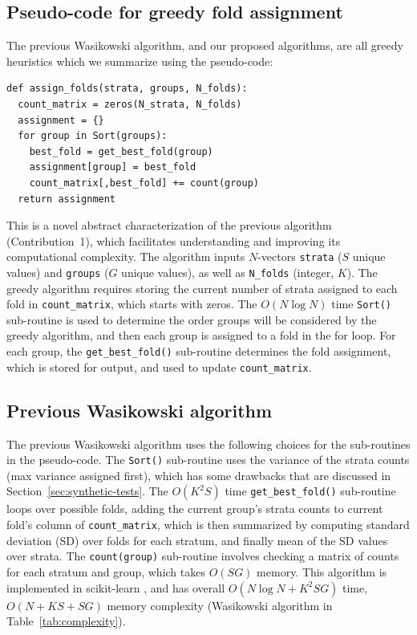 \documentclass[twoside]{article}
\begin{document}
\subsection{Pseudo-code for greedy fold assignment}
\label{sec:pseudo-code}
The previous Wasikowski algorithm, and our proposed algorithms, are all greedy heuristics which we summarize using the pseudo-code:
\begin{verbatim}
def assign_folds(strata, groups, N_folds):
  count_matrix = zeros(N_strata, N_folds)
  assignment = {}
  for group in Sort(groups):
    best_fold = get_best_fold(group)
    assignment[group] = best_fold
    count_matrix[,best_fold] += count(group)
  return assignment
\end{verbatim}
This is a novel abstract characterization of the previous algorithm (Contribution~1), which facilitates understanding and improving its computational complexity.
The algorithm inputs $N$-vectors \texttt{strata} ($S$ unique values) and \texttt{groups} ($G$ unique values), as well as \texttt{N\_folds} (integer, $K$).
The greedy algorithm requires storing the current number of strata assigned to each fold in \texttt{count\_matrix}, which starts with zeros.
The $O(N\log N)$ time \texttt{Sort()} sub-routine is used to determine the order groups will be considered by the greedy algorithm, and then each group is assigned to a fold in the for loop.
For each group, the \texttt{get\_best\_fold()} sub-routine determines the fold assignment, which is stored for output, and used to update \texttt{count\_matrix}.

\subsection{Previous Wasikowski algorithm}

The previous Wasikowski algorithm uses the following choices for the sub-routines in the pseudo-code.
The \texttt{Sort()} sub-routine uses the variance of the strata counts (max variance assigned first), which has some drawbacks that are discussed in Section~\ref{sec:synthetic-tests}.
The $O(K^2 S)$ time \texttt{get\_best\_fold()} sub-routine loops over possible folds, adding the current group’s strata counts to current fold’s column of \texttt{count\_matrix}, which is then summarized by computing standard deviation (SD) over folds for each stratum, and finally mean of the SD values over strata.
The \texttt{count(group)} sub-routine involves checking a matrix of counts for each stratum and group, which takes $O(SG)$ memory.
This algorithm is implemented in scikit-learn \citep{sklearn2011}, and has overall $O(N\log N+K^2SG)$ time, $O(N+KS+SG)$ memory complexity (Wasikowski algorithm in Table~\ref{tab:complexity}).
\end{document}
